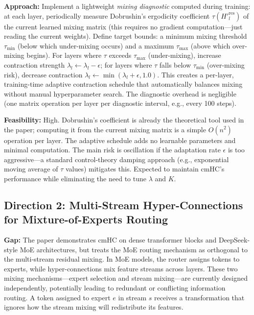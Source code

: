 \documentclass[11pt,a4paper]{article}
\begin{document}
\textbf{Approach:} Implement a lightweight \emph{mixing diagnostic} computed during training: at each layer, periodically measure Dobrushin's ergodicity coefficient $\tau(H'^{\mathrm{res}}_l)$ of the current learned mixing matrix (this requires no gradient computation---just reading the current weights). Define target bounds: a minimum mixing threshold $\tau_{\min}$ (below which under-mixing occurs) and a maximum $\tau_{\max}$ (above which over-mixing begins). For layers where $\tau$ exceeds $\tau_{\max}$ (under-mixing), increase contraction strength $\lambda_l \leftarrow \lambda_l - \epsilon$; for layers where $\tau$ falls below $\tau_{\min}$ (over-mixing risk), decrease contraction $\lambda_l \leftarrow \min(\lambda_l + \epsilon, 1.0)$. This creates a per-layer, training-time adaptive contraction schedule that automatically balances mixing without manual hyperparameter search. The diagnostic overhead is negligible (one matrix operation per layer per diagnostic interval, e.g., every 100 steps).

\textbf{Feasibility:} High. Dobrushin's coefficient is already the theoretical tool used in the paper; computing it from the current mixing matrix is a simple $O(n^2)$ operation per layer. The adaptive schedule adds no learnable parameters and minimal computation. The main risk is oscillation if the adaptation rate $\epsilon$ is too aggressive---a standard control-theory damping approach (e.g., exponential moving average of $\tau$ values) mitigates this. Expected to maintain cmHC's performance while eliminating the need to tune $\lambda$ and $K$.

\subsection{Direction 2: Multi-Stream Hyper-Connections for Mixture-of-Experts Routing}
\textbf{Gap:} The paper demonstrates cmHC on dense transformer blocks and DeepSeek-style MoE architectures, but treats the MoE routing mechanism as orthogonal to the multi-stream residual mixing. In MoE models, the router assigns tokens to experts, while hyper-connections mix feature streams across layers. These two mixing mechanisms---expert selection and stream mixing---are currently designed independently, potentially leading to redundant or conflicting information routing. A token assigned to expert $e$ in stream $s$ receives a transformation that ignores how the stream mixing will redistribute its features.
\end{document}

